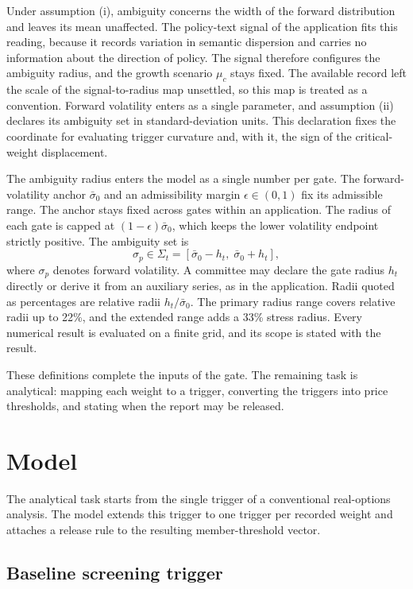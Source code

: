 \documentclass[5p,times,authoryear]{elsarticle}
\theoremstyle{plain}
\newcommand{\sbar}{\bar{\sigma}_0}
\begin{document}
Under assumption (i), ambiguity concerns the width of the forward distribution and leaves its mean unaffected. The policy-text signal of the application fits this reading, because it records variation in semantic dispersion and carries no information about the direction of policy. The signal therefore configures the ambiguity radius, and the growth scenario $\mu_c$ stays fixed. The available record left the scale of the signal-to-radius map unsettled, so this map is treated as a convention. Forward volatility enters as a single parameter, and assumption (ii) declares its ambiguity set in standard-deviation units. This declaration fixes the coordinate for evaluating trigger curvature and, with it, the sign of the critical-weight displacement.

The ambiguity radius enters the model as a single number per gate. The forward-volatility anchor $\sbar$ and an admissibility margin $\epsilon\in(0,1)$ fix its admissible range. The anchor stays fixed across gates within an application. The radius of each gate is capped at $(1-\epsilon)\sbar$, which keeps the lower volatility endpoint strictly positive. The ambiguity set is
\begin{equation}
\sigma_p\in\Sigma_t=[\sbar-h_t,\;\sbar+h_t],
\label{eq:ambset}
\end{equation}
where $\sigma_p$ denotes forward volatility. A committee may declare the gate radius $h_t$ directly or derive it from an auxiliary series, as in the application. Radii quoted as percentages are relative radii $h_t/\sbar$. The primary radius range covers relative radii up to 22\%, and the extended range adds a 33\% stress radius. Every numerical result is evaluated on a finite grid, and its scope is stated with the result.

These definitions complete the inputs of the gate. The remaining task is analytical: mapping each weight to a trigger, converting the triggers into price thresholds, and stating when the report may be released.

\section{Model}

The analytical task starts from the single trigger of a conventional real-options analysis. The model extends this trigger to one trigger per recorded weight and attaches a release rule to the resulting member-threshold vector.

\subsection{Baseline screening trigger}
\end{document}
